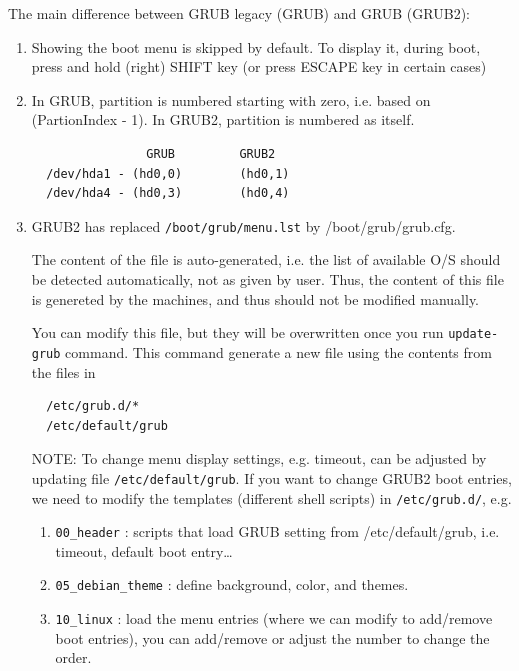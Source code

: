 The main difference between GRUB legacy (GRUB) and GRUB (GRUB2):
\begin{enumerate}

  \item Showing the boot menu is skipped by default. To display it, during boot,
  press and hold (right) SHIFT key (or press ESCAPE key in certain cases)
  
  \item In GRUB, partition is numbered starting with zero, i.e. based on
  (PartionIndex - 1). In GRUB2, partition is numbered as itself.
  \begin{verbatim}
                GRUB         GRUB2
  /dev/hda1 - (hd0,0)        (hd0,1)
  /dev/hda4 - (hd0,3)        (hd0,4) 
  \end{verbatim}
  
  \item GRUB2 has replaced \verb!/boot/grub/menu.lst! by /boot/grub/grub.cfg.
  
  The content of the file is auto-generated, i.e. the list of available O/S
  should be detected automatically, not as given by user. Thus, the content of
  this file is genereted by the machines, and thus should not be modified
  manually.
  
  You can modify this file, but they will be overwritten once you run
  \verb!update-grub! command. This command generate a new file using the
  contents from the files in
  \begin{verbatim}
  /etc/grub.d/*
  /etc/default/grub
  \end{verbatim}
  
  NOTE: To change menu display settings, e.g. timeout, can be
  adjusted by updating file \verb!/etc/default/grub!.
  If you want to change GRUB2 boot entries, we need to modify the templates
  (different shell scripts) in \verb!/etc/grub.d/!, e.g.

\begin{enumerate}
  \item \verb!00_header! : scripts that load GRUB setting from
  /etc/default/grub, i.e. timeout, default boot entry\ldots
  
  \item \verb!05_debian_theme! : define background, color, and themes.
  
  \item \verb!10_linux! : load the menu entries	(where we can modify to
  add/remove boot entries), you can
  add/remove or adjust the number to change the order.
  

\end{enumerate}
\end{enumerate}
